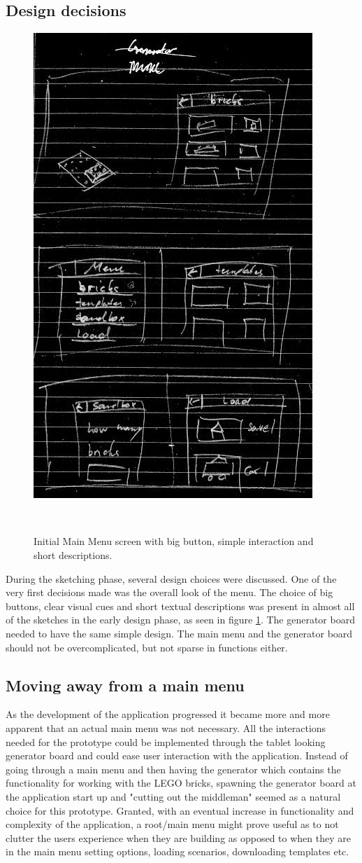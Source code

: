 \subsection{Design decisions}
\begin{figure}[t]
	\centering
	\includegraphics[width=0.5\columnwidth]{figures/Menu/menu1.png}
	\caption{Initial Main Menu screen with big button, simple interaction and short descriptions.}~\label{fig:genboard}
\end{figure}
During the sketching phase, several design choices were discussed. One of the very first decisions made was the overall look of the menu. The choice of big buttons, clear visual cues and short textual descriptions was present in almost all of the sketches in the early design phase, as seen in figure \ref{fig:genboard}. The generator board needed to have the same simple design. The main menu and the generator board should not be overcomplicated, but not sparse in functions either. 
\subsection{Moving away from a main menu}
As the development of the application progressed it became more and more apparent that an actual main menu was not necessary. All the interactions needed for the prototype could be implemented through the tablet looking generator board and could ease user interaction with the application. Instead of going through a main menu and then having the generator which contains the functionality for working with the LEGO bricks, spawning the generator board at the application start up and "cutting out the middleman" seemed as a natural choice for this prototype. Granted, with an eventual increase in functionality and complexity of the application, a root/main menu might prove useful as to not clutter the users experience when they are building as opposed to when they are in the main menu setting options, loading scenarios, downloading templates etc.